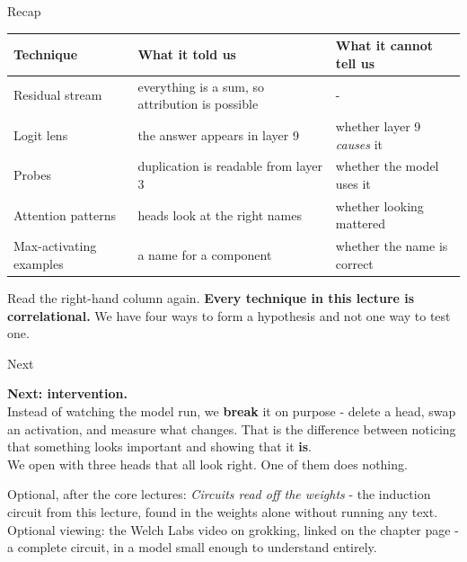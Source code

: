 \documentclass[aspectratio=169]{beamer}
\newcommand{\trapbox}[1]{%
  \begin{tcolorbox}[colback=armred!8, colframe=armred, boxrule=0.6pt, arc=2pt]
  #1
  \end{tcolorbox}}
\newcommand{\takebox}[1]{%
  \begin{tcolorbox}[colback=paramgreen!8, colframe=paramgreen, boxrule=0.6pt, arc=2pt]
  #1
  \end{tcolorbox}}
\begin{document}
\begin{frame}{Recap}
  \vspace{0.4em}
  \begin{center}
  \small
  \begin{tabular}{@{}>{\raggedright\arraybackslash}p{}>{\raggedright\arraybackslash}p{}>{\raggedright\arraybackslash}p{}@{}}
    \toprule
    \textbf{Technique} & \textbf{What it told us} & \textbf{What it cannot tell us}\\
    \midrule
    Residual stream & everything is a sum, so attribution is possible & -\\[0.3em]
    Logit lens & the answer appears in layer 9 & whether layer 9 \emph{causes} it\\[0.3em]
    Probes & duplication is readable from layer 3 & whether the model uses it\\[0.3em]
    Attention patterns & heads look at the right names & whether looking mattered\\[0.3em]
    Max-activating examples & a name for a component & whether the name is correct\\
    \bottomrule
  \end{tabular}
  \end{center}

  \vspace{0.7em}
  \trapbox{Read the right-hand column again. \textbf{Every technique in this lecture is
  correlational.} We have four ways to form a hypothesis and not one way to test one.}
\end{frame}

\begin{frame}{Next}
  \vspace{1.2em}
  \takebox{\textbf{Next: intervention.}\\[0.6em]
  Instead of watching the model run, we \textbf{break} it on purpose - delete a head, swap an
  activation, and measure what changes. That is the difference between noticing that something
  looks important and showing that it \textbf{is}.\\[0.8em]
  We open with three heads that all look right. One of them does nothing.}

  \vspace{1.0em}
  \begin{center}
    {\footnotesize Optional, after the core lectures: \emph{Circuits read off the weights} - the
    induction circuit from this lecture, found in the weights alone without running any
    text.\\[0.3em]
    Optional viewing: the Welch Labs video on grokking, linked on the chapter page - a complete
    circuit, in a model small enough to understand entirely.}
  \end{center}
\end{frame}
\end{document}
